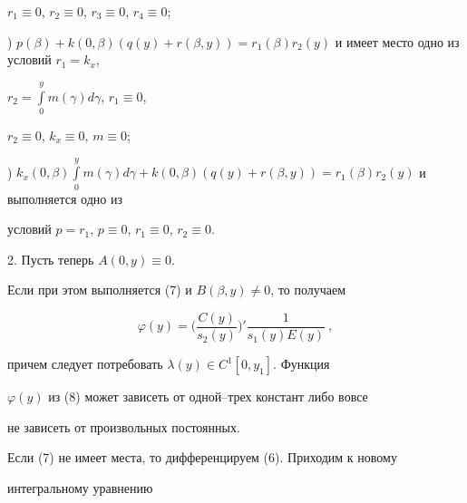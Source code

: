 $r_{1}\equiv0$, $r_{2}\equiv0$, $r_{3}\equiv0$, $r_{4}\equiv0$;





) $p(\beta)+k(0,\beta)(q(y)+r(\beta,y))=r_{1}(\beta)


r_{2}(y)$ и имеет место одно из условий $r_{1}=k_{x}$,


$r_{2}=\int \limits_{0}^{y} m(\gamma) d\gamma$, $r_{1}\equiv0$,


$r_{2}\equiv0$, $k_{x}\equiv0$, $m\equiv0$;





) $k_{x}(0,\beta)\int\limits_{0}^{y} m(\gamma)d\gamma+k(0,\beta)(


q(y)+r(\beta,y)) =r_{1}(\beta)r_{2}(y)$ и выполняется одно из


условий $p=r_{1}$, $p\equiv0$, $r_{1}\equiv0$, $r_{2}\equiv0$.


\medskip





2. Пусть теперь $A(0,y)\equiv0$.





Если при этом выполняется (7) и $B(\beta,y)\ne0$, то получаем


\begin{equation}


\varphi(y) = \bigg (\frac{C(y)}{s_{2}(y)} \bigg)'


\frac{1}{s_{1}(y)E(y)}\ ,


\end{equation}


причем следует потребовать $\lambda(y)\in C^{1}[0,y_{1}]$. Функция


$\varphi(y)$ из (8) может зависеть от одной--трех констант либо вовсе


не зависеть от произвольных постоянных.








Если (7) не имеет места, то дифференцируем (6). Приходим к новому


интегральному уравнению


